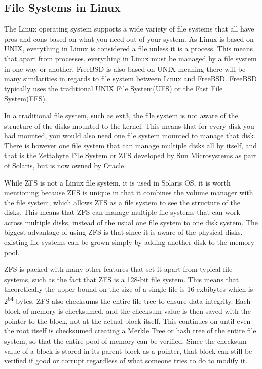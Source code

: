 \documentclass[10pt,serif,draftclsnofoot,onecolumn]{IEEEtran}
\begin{document}
	\subsection{File Systems in Linux}
	\par
			The Linux operating system supports a wide variety of file systems that all have pros and cons based on what you need out of your system. As Linux is based on UNIX, everything in Linux is considered a file unless it is a process. This means that apart from processes, everything in Linux must be managed by a file system in one way or another. FreeBSD is also based on UNIX meaning there will be many similarities in regards to file system between Linux and FreeBSD. FreeBSD typically uses the traditional UNIX File System(UFS) or the Fast File System(FFS)\cite{18}.
	\newline
	\par
			In a traditional file system, such as ext3, the file system is not aware of the structure of the disks mounted to the kernel. This means that for every disk you had mounted, you would also need one file system mounted to manage that disk. There is however one file system that can manage multiple disks all by itself, and that is the Zettabyte File System or ZFS developed by Sun Microsystems as part of Solaris, but is now owned by Oracle.\newline
		\par
			While ZFS is not a Linux file system, it is used in Solaris OS, it is worth mentioning because ZFS is unique in that it combines the volume manager with the file system, which allows ZFS as a file system to see the structure of the disks\cite{17}. This means that ZFS can manage multiple file systems that can work across multiple disks, instead of the usual one file system to one disk system. The biggest advantage of using ZFS is that since it is aware of the physical disks, existing file systems can be grown simply by adding another disk to the memory pool\cite{17}.
	\newline
	\par
			ZFS is packed with many other features that set it apart from typical file systems, such as the fact that ZFS is a 128-bit file system. This means that theoretically the upper bound on the size of a single file is 16 exbibytes which is 2\textsuperscript{64} bytes\cite{17}. ZFS also checksums the entire file tree to ensure data integrity. Each block of memory is checksumed, and the checksum value is then saved with the pointer to the block, not at the actual block itself. This continues on until even the root itself is checksumed creating a Merkle Tree or hash tree of the entire file system, so that the entire pool of memory can be verified. Since the checksum value of a block is stored in its parent block as a pointer, that block can still be verified if good or corrupt regardless of what someone tries to do to modify it\cite{17}.
	\newline
\end{document}
